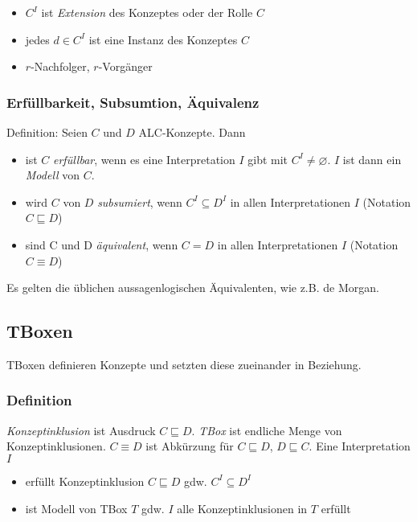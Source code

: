 \begin{itemize}
\item
  $C^{I}$ ist \emph{Extension} des Konzeptes oder der Rolle $C$
\item
  jedes $d \in C^{I}$ ist eine Instanz des Konzeptes $C$
\item
  $r$-Nachfolger, $r$-Vorgänger
\end{itemize}

\hypertarget{erfuxfcllbarkeit-subsumtion-uxe4quivalenz}{\subsubsection{Erfüllbarkeit,
Subsumtion,
Äquivalenz}\label{erfuxfcllbarkeit-subsumtion-uxe4quivalenz}}

Definition: Seien $C$ und $D$ ALC-Konzepte. Dann

\begin{itemize}
\item
  ist $C$ \emph{erfüllbar}, wenn es eine Interpretation $I$ gibt mit
  $C^{I} \neq \varnothing$. $I$ ist dann ein \emph{Modell} von
  $C$.
\item
  wird $C$ von $D$ \emph{subsumiert}, wenn $C^{I} \subseteq D^{I}$
  in allen Interpretationen $I$ (Notation $C \sqsubseteq D$)
\item
  sind C und D \emph{äquivalent}, wenn $C = D$ in allen
  Interpretationen $I$ (Notation $C \equiv D$)
\end{itemize}

Es gelten die üblichen aussagenlogischen Äquivalenten, wie z.B. de
Morgan.

\subsection{TBoxen}\label{tboxen}

TBoxen definieren Konzepte und setzten diese zueinander in Beziehung.

\subsubsection{Definition}\label{definition-1}

\emph{Konzeptinklusion} ist Ausdruck $C \sqsubseteq D$. \emph{TBox}
ist endliche Menge von Konzeptinklusionen. $C \equiv D$ ist Abkürzung
für $C \sqsubseteq D$, $D \sqsubseteq C$. Eine Interpretation $I$

\begin{itemize}
\item
  erfüllt Konzeptinklusion $C \sqsubseteq D$ gdw.
  $C^{I} \subseteq D^{I}$
\item
  ist Modell von TBox $T$ gdw. $I$ alle Konzeptinklusionen in $T$
  erfüllt
\end{itemize}

